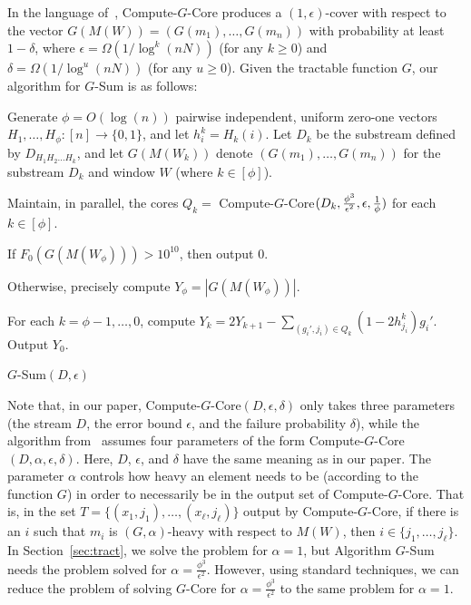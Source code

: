 \documentclass[11pt]{article}
\begin{document}
In the language of~\cite{BO13}, Compute-$G$-Core produces a $(1,\epsilon)$-cover with respect to the
vector $G(M(W)) = (G(m_1),\ldots,G(m_n))$ with probability at least $1-\delta$, where $\epsilon = \Omega(1/\log^k(nN))$
(for any $k \geq 0$) and $\delta = \Omega(1/\log^{u}(nN))$ (for any $u \geq 0$).  Given the tractable function
$G$, our algorithm for $G$-Sum is as follows:

\bigskip

\begin{algorithm}[H]\label{alg:gsum}
\DontPrintSemicolon
Generate $\phi=O(\log(n))$ pairwise independent, uniform zero-one vectors $H_1, \dots, H_\phi: [n] \rightarrow \{0,1\}$,
and let $h_i^k = H_k(i)$.
Let $D_k$ be the substream defined by $D_{H_1H_2\dots H_k}$, and let $G(M(W_k))$ denote
$(G(m_1),\ldots,G(m_n))$ for the substream $D_k$
and window $W$ (where $k \in [\phi]$). \;

Maintain, in parallel, the cores $Q_k = $ Compute-$G$-Core$(D_k, {\phi^3\over \epsilon^2}, \epsilon, {1\over \phi})$ for each $k \in [\phi]$. \;

If $F_0(G(M(W_\phi))) > 10^{10}$, then output $0$. \;

Otherwise, precisely compute $Y_\phi = |G(M(W_\phi))|$. \;

For each $k = \phi-1,\dots, 0$, compute $Y_k = 2Y_{k+1} - \sum_{(g_i', j_i) \in Q_k} (1-2h_{j_i}^k)g_i'$. \;
Output $Y_0$. \;
\caption{$G$-Sum$(D, \epsilon)$}
\end{algorithm}

Note that, in our paper, Compute-$G$-Core$(D,\epsilon,\delta)$ only takes three parameters (the stream $D$, the
error bound $\epsilon$, and the failure probability $\delta$), while the algorithm from~\cite{BO13} assumes
four parameters of the form Compute-$G$-Core$(D,\alpha,\epsilon,\delta)$.  Here, $D$, $\epsilon$, and $\delta$
have the same meaning as in our paper.  The parameter $\alpha$ controls how heavy an element needs to be
(according to the function $G$) in order to necessarily be in the output set of Compute-$G$-Core.  That is,
in the set $T = \{(x_1,j_1),\ldots,(x_\ell,j_\ell)\}$ output by Compute-$G$-Core, if there is an $i$ such that
$m_i$ is $(G,\alpha)$-heavy with respect to $M(W)$, then $i \in \{j_1,\ldots,j_\ell \}$.  In
Section~\ref{sec:tract}, we solve the problem for $\alpha = 1$, but Algorithm $G$-Sum needs the problem
solved for $\alpha = \frac{\phi^3}{\epsilon^2}$. However, using standard techniques, we can reduce the problem of
solving $G$-Core for $\alpha = \frac{\phi^3}{\epsilon^2}$ to the same problem for $\alpha = 1$.
\end{document}
